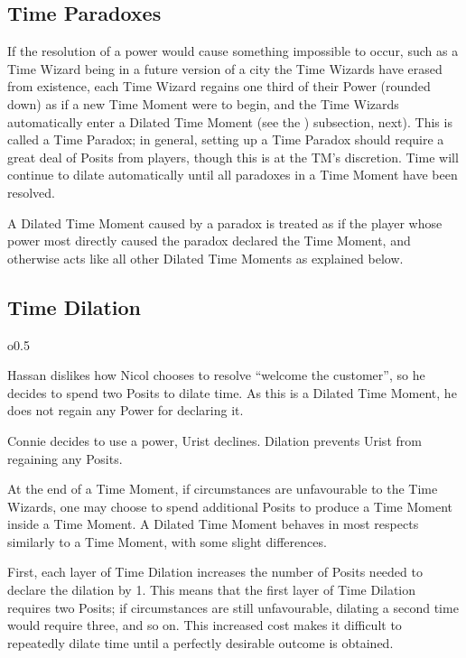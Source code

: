 \documentclass[twoside]{article}
\newenvironment{examplebox}[1]{\begin{tcolorbox}[colback=green!5!white,colframe=green!75!black,title={Example: #1}]}{\end{tcolorbox}\vspace{-30pt}}
\begin{document}
\subsection{Time Paradoxes} \label{ssec:time-paradox}
If the resolution of a power would cause something impossible to occur, such as a Time Wizard
being in a future version of a city the Time Wizards have erased from existence, each Time
Wizard regains one third of their Power (rounded down) as if a new Time Moment were to begin,
and the Time Wizards automatically enter a Dilated Time Moment (see the
) subsection, next). This is called a Time Paradox; in general,
setting up a Time Paradox should require a great deal of Posits from players, though this is at
the TM's discretion. Time will continue to dilate automatically until all paradoxes in a Time
Moment have been resolved.

A Dilated Time Moment caused by a paradox is treated as if the player whose power most directly
caused the paradox declared the Time Moment, and otherwise acts like all other Dilated Time
Moments as explained below.

\subsection{Time Dilation} \label{ssec:time-dilation}
\begin{wrapfigure}{o}{0.5\textwidth}
   \vspace{-20pt}
   \begin{examplebox}{Time Dilation}
      Hassan dislikes how Nicol chooses to resolve ``welcome the customer'', so he decides
      to spend two Posits to dilate time. As this is a Dilated Time Moment, he does not regain
      any Power for declaring it.

      Connie decides to use a power, Urist declines. Dilation prevents Urist from regaining any
      Posits.
   \end{examplebox}
   \vspace{25pt}
\end{wrapfigure}

At the end of a Time Moment, if circumstances are unfavourable to the Time Wizards, one may
choose to spend additional Posits to produce a Time Moment inside a Time Moment. A Dilated Time
Moment behaves in most respects similarly to a Time Moment, with some slight differences.

First, each layer of Time Dilation increases the number of Posits needed to declare the dilation
by 1. This means that the first layer of Time Dilation requires two Posits; if circumstances are
still unfavourable, dilating a second time would require three, and so on. This increased cost
makes it difficult to repeatedly dilate time until a perfectly desirable outcome is obtained.
\end{document}

